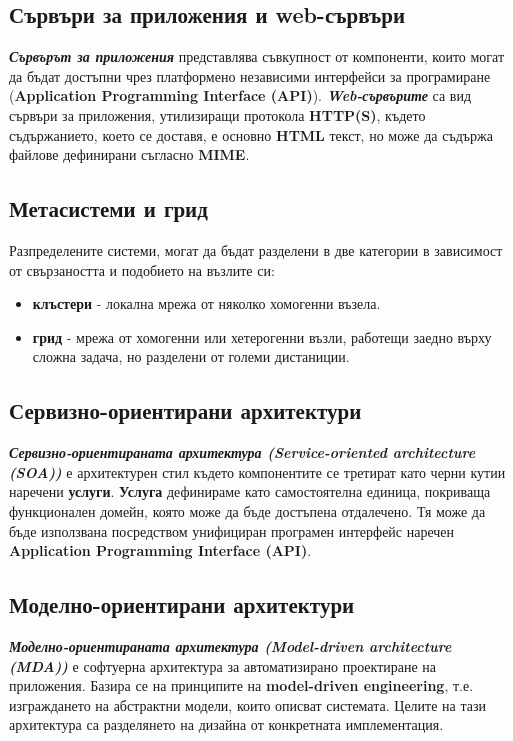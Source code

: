 \documentclass[fleqn,12pt]{article}
\begin{document}
\subsection{Сървъри за приложения и web-сървъри}

\textbf{\textit{Сървърът за приложения}} представлява съвкупност от компоненти, които могат да бъдат достъпни чрез платформено независими интерфейси за програмиране (\textbf{Application Programming Interface (API)}).
\textbf{\textit{Web-сървърите}} са вид сървъри за приложения, утилизиращи протокола \textbf{HTTP(S)}, където съдържанието, което се доставя, е основно \textbf{HTML} текст, но може да съдържа файлове дефинирани съгласно \textbf{MIME}.

\subsection{Метасистеми и грид}

Разпределените системи, могат да бъдат разделени в две категории в зависимост от свързаността и подобието на възлите си:
\begin{itemize}
    \item \textbf{клъстери} - локална мрежа от няколко хомогенни възела.
    \item \textbf{грид} - мрежа от хомогенни или хетерогенни възли, работещи заедно върху сложна задача, но разделени от големи дистаниции.
\end{itemize}

\subsection{Сервизно-ориентирани архитектури}

\textbf{\textit{Сервизно-ориентираната архитектура (Service-oriented architecture (SOA))}} е архитектурен стил където компонентите се третират като черни кутии наречени \textbf{услуги}.
\textbf{Услуга} дефинираме като самостоятелна единица, покриваща функционален домейн, която може да бъде достъпена отдалечено.
Тя може да бъде използвана посредством унифициран програмен интерфейс наречен \textbf{Application Programming Interface (API)}.

\subsection{Моделно-ориентирани архитектури}

\textbf{\textit{Моделно-ориентираната архитектура (Model-driven architecture (MDA))}} е софтуерна архитектура за автоматизирано проектиране на приложения.
Базира се на принципите на \textbf{model-driven engineering}, т.е. изграждането на абстрактни модели, които описват системата.
Целите на тази архитектура са разделянето на дизайна от конкретната имплементация.
\end{document}

